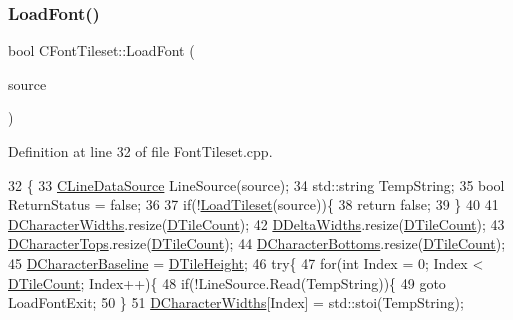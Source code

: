 \subsubsection{\texorpdfstring{Load\+Font()}{LoadFont()}}
{\footnotesize\ttfamily bool C\+Font\+Tileset\+::\+Load\+Font (\begin{DoxyParamCaption}\item[{std\+::shared\+\_\+ptr$<$ \hyperlink{classCDataSource}{C\+Data\+Source} $>$}]{source }\end{DoxyParamCaption})}



Definition at line 32 of file Font\+Tileset.\+cpp.


\begin{DoxyCode}
32                                                               \{
33     \hyperlink{classCLineDataSource}{CLineDataSource} LineSource(source);
34     std::string TempString;
35     \textcolor{keywordtype}{bool} ReturnStatus = \textcolor{keyword}{false};
36     
37     \textcolor{keywordflow}{if}(!\hyperlink{classCGraphicTileset_a7d47754f26f03958be28a064f54eef1d}{LoadTileset}(source))\{
38         \textcolor{keywordflow}{return} \textcolor{keyword}{false};    
39     \}
40     
41     \hyperlink{classCFontTileset_ad25347b5350a8380be8c550d9f2e2798}{DCharacterWidths}.resize(\hyperlink{classCGraphicTileset_a39d942b370e47f441bf97385eb1037c8}{DTileCount});
42     \hyperlink{classCFontTileset_a1e253853e14282e9582a7f47dace8f70}{DDeltaWidths}.resize(\hyperlink{classCGraphicTileset_a39d942b370e47f441bf97385eb1037c8}{DTileCount});
43     \hyperlink{classCFontTileset_aa009ebe41a491d854a5f6005919649c2}{DCharacterTops}.resize(\hyperlink{classCGraphicTileset_a39d942b370e47f441bf97385eb1037c8}{DTileCount});
44     \hyperlink{classCFontTileset_a13d7063022d59bf3347452c78be50a8b}{DCharacterBottoms}.resize(\hyperlink{classCGraphicTileset_a39d942b370e47f441bf97385eb1037c8}{DTileCount});
45     \hyperlink{classCFontTileset_aba19d07744c08aeb957728067c52466c}{DCharacterBaseline} = \hyperlink{classCGraphicTileset_af48f32e07d5fe69afd5f764318cc3244}{DTileHeight};
46     \textcolor{keywordflow}{try}\{
47         \textcolor{keywordflow}{for}(\textcolor{keywordtype}{int} Index = 0; Index < \hyperlink{classCGraphicTileset_a39d942b370e47f441bf97385eb1037c8}{DTileCount}; Index++)\{
48             \textcolor{keywordflow}{if}(!LineSource.Read(TempString))\{
49                 \textcolor{keywordflow}{goto} LoadFontExit;
50             \}
51             \hyperlink{classCFontTileset_ad25347b5350a8380be8c550d9f2e2798}{DCharacterWidths}[Index] = std::stoi(TempString);

\end{DoxyCode}
